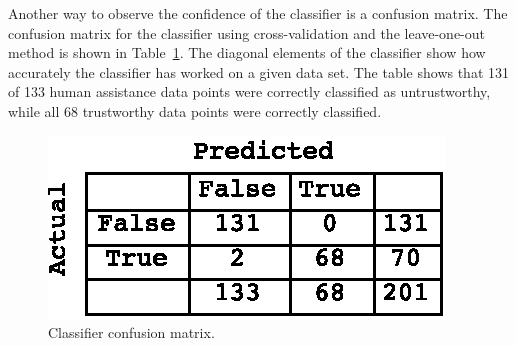 \documentclass{sig-alternate}
\begin{document}

Another way to observe the confidence of the classifier is a confusion
matrix. The confusion matrix for the classifier using cross-validation
and the leave-one-out method is shown in
Table~\ref{fig:conf_matrix}. The diagonal elements of the classifier
show how accurately the classifier has worked on a given data set. The
table shows that 131 of 133 human assistance data points were
correctly classified as untrustworthy, while all 68 trustworthy
data points were correctly classified.

\begin{figure}
\centering
\includegraphics[width=.3\textwidth]{confusion-matrix.eps}
\caption{Classifier confusion matrix.}
\label{fig:conf_matrix}
\end{figure}

    
\end{document}
